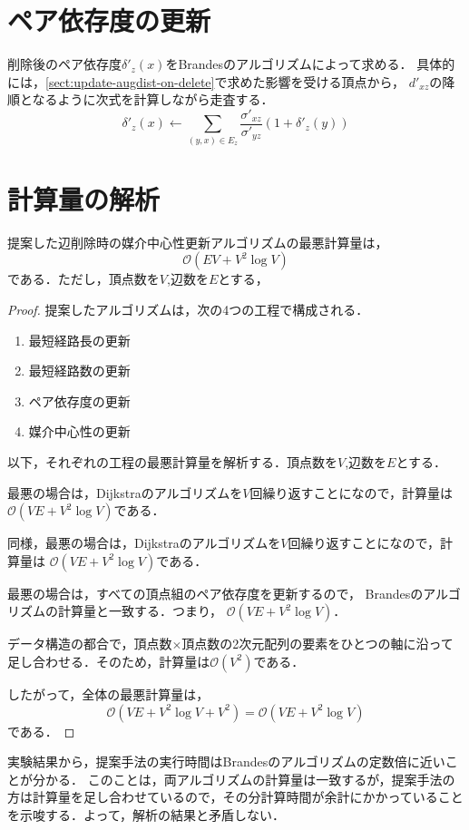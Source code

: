 \section{ペア依存度の更新}
\label{sect:update-delta-on-delete}

削除後のペア依存度$\delta'_z(x)$をBrandesのアルゴリズムによって求める．
具体的には，\ref{sect:update-augdist-on-delete}で求めた影響を受ける頂点から，
$d'_{xz}$の降順となるように次式を計算しながら走査する．
\[ \delta'_{z}(x)\gets\sum_{(y,x)\in E_z}\frac{\sigma'_{xz}}{\sigma'_{yz}}(1+\delta'_z(y)) \]

\section{計算量の解析}

\begin{lemma}
  提案した辺削除時の媒介中心性更新アルゴリズムの最悪計算量は，
  \[ \mathcal{O}(EV+V^2\log V) \]
  である．ただし，頂点数を$V$,辺数を$E$とする，
\end{lemma}
\begin{proof}
  提案したアルゴリズムは，次の4つの工程で構成される．
  \begin{enumerate}
  \item 最短経路長の更新
  \item 最短経路数の更新
  \item ペア依存度の更新
  \item 媒介中心性の更新
  \end{enumerate}

  以下，それぞれの工程の最悪計算量を解析する．頂点数を$V$,辺数を$E$とする．

  最悪の場合は，Dijkstraのアルゴリズムを$V$回繰り返すことになので，計算量は
  $\mathcal{O}(VE+V^2\log V)$である．

  同様，最悪の場合は，Dijkstraのアルゴリズムを$V$回繰り返すことになので，計算量は
  $\mathcal{O}(VE+V^2\log V)$である．

  最悪の場合は，すべての頂点組のペア依存度を更新するので，
  Brandesのアルゴリズムの計算量と一致する．つまり，
  $\mathcal{O}(VE+V^2\log V)$．

  データ構造の都合で，頂点数$\times$頂点数の2次元配列の要素をひとつの軸に沿って
  足し合わせる．そのため，計算量は$\mathcal{O}(V^2)$である．

  したがって，全体の最悪計算量は，
  \[ \mathcal{O}(VE+V^2\log V+V^2)=\mathcal{O}(VE+V^2\log V) \]
  である．
\end{proof}

実験結果から，提案手法の実行時間はBrandesのアルゴリズムの定数倍に近いことが分かる．
このことは，両アルゴリズムの計算量は一致するが，提案手法の方は計算量を足し合わせているので，その分計算時間が余計にかかっていることを示唆する．よって，解析の結果と矛盾しない．

